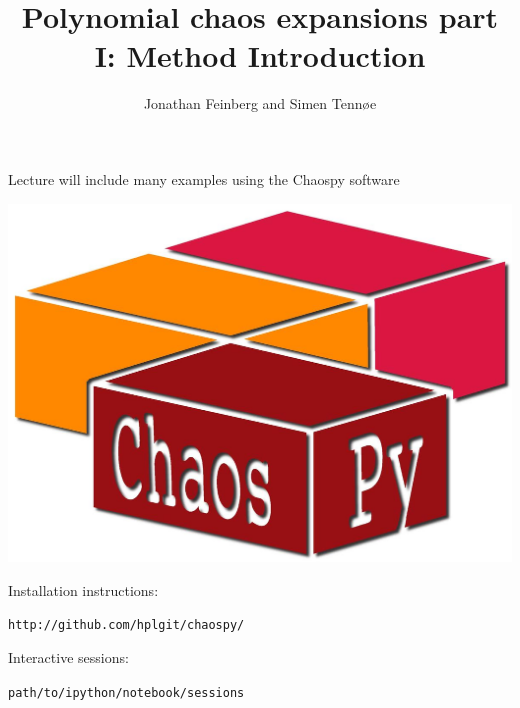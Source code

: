 \documentclass{beamer}
\title{Polynomial chaos expansions part I: Method Introduction}
\author{Jonathan Feinberg and Simen Tennøe}
\begin{document}
\begin{frame}
  \maketitle
\end{frame}

\begin{frame}[fragile]{Lecture will include many examples using the
    Chaospy software}
  \begin{center}
     \includegraphics[width=.5\textwidth]{chaospy_logo.jpg}
  \end{center}
  \begin{alert}{Installation instructions:}

\verb;http://github.com/hplgit/chaospy/;
  \end{alert}

    \begin{alert}{Interactive sessions:}

\verb;path/to/ipython/notebook/sessions;
  \end{alert}
\end{frame}
\end{document}
